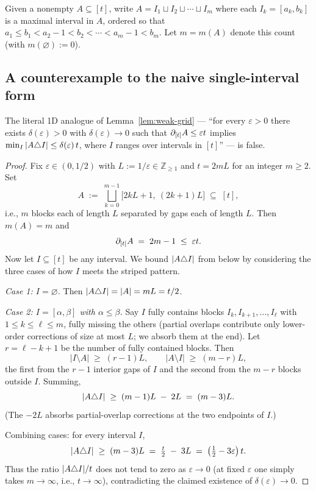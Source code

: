 \begin{definition}\label{def:max-intervals}
Given a nonempty $A \subseteq [t]$, write
$A = I_1 \sqcup I_2 \sqcup \cdots \sqcup I_m$ where each $I_k = [a_k, b_k]$
is a maximal interval in $A$, ordered so that $a_1 \le b_1 < a_2 - 1
< b_2 < \cdots < a_m - 1 < b_m$. Let $m = m(A)$ denote this count
(with $m(\varnothing) := 0$).
\end{definition}

\subsection{A counterexample to the naive single-interval form}

\begin{proposition}\label{prop:counterexample}
The literal 1D analogue of Lemma~\ref{lem:weak-grid} --- ``for every
$\varepsilon > 0$ there exists $\delta(\varepsilon) > 0$ with
$\delta(\varepsilon) \to 0$ such that $\partial_{[t]} A \le \varepsilon t$
implies $\min_{I} |A \triangle I| \le \delta(\varepsilon)\, t$, where $I$
ranges over intervals in $[t]$'' --- is false.
\end{proposition}

\begin{proof}
Fix $\varepsilon \in (0, 1/2)$ with $L := 1/\varepsilon \in
\mathbb{Z}_{\ge 1}$ and $t = 2mL$ for an integer $m \ge 2$. Set
\[
A \;:=\; \bigsqcup_{k=0}^{m-1} \bigl[2kL + 1,\ (2k+1)L\bigr] \;\subseteq\; [t],
\]
i.e., $m$ blocks each of length $L$ separated by gaps each of length
$L$. Then $m(A) = m$ and
\[
\partial_{[t]} A \;=\; 2m - 1 \;\le\; \varepsilon t.
\]
Now let $I \subseteq [t]$ be any interval. We bound $|A \triangle I|$
from below by considering the three cases of how $I$ meets the
striped pattern.

\smallskip
\noindent\emph{Case 1: $I = \varnothing$.} Then $|A \triangle I| = |A| = mL = t/2$.

\smallskip
\noindent\emph{Case 2: $I = [\alpha, \beta]$ with $\alpha \le \beta$.}
Say $I$ fully contains blocks $I_k, I_{k+1}, \dots, I_\ell$ with $1
\le k \le \ell \le m$, fully missing the others (partial overlaps
contribute only lower-order corrections of size at most $L$; we absorb
them at the end). Let $r = \ell - k + 1$ be the number of fully
contained blocks. Then
\[
|I \setminus A| \;\ge\; (r - 1) L,\qquad
|A \setminus I| \;\ge\; (m - r) L,
\]
the first from the $r-1$ interior gaps of $I$ and the second from the
$m-r$ blocks outside $I$. Summing,
\[
|A \triangle I| \;\ge\; (m-1) L \;-\; 2L \;=\; (m-3) L.
\]
(The $-2L$ absorbs partial-overlap corrections at the two endpoints
of $I$.)

\smallskip
Combining cases: for every interval $I$,
\[
|A \triangle I| \;\ge\; (m-3) L \;=\; \tfrac{t}{2} \;-\; 3L \;=\; \bigl(\tfrac{1}{2} - 3\varepsilon\bigr)\,t.
\]
Thus the ratio $|A \triangle I|/t$ does not tend to zero as
$\varepsilon \to 0$ (at fixed $\varepsilon$ one simply takes $m \to
\infty$, i.e., $t \to \infty$), contradicting the claimed existence of
$\delta(\varepsilon) \to 0$.
\end{proof}

